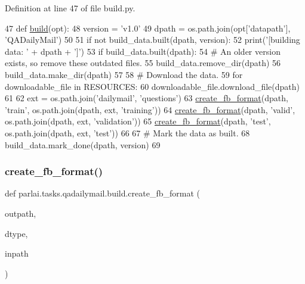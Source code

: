Definition at line 47 of file build.\+py.


\begin{DoxyCode}
47 \textcolor{keyword}{def }\hyperlink{namespacedialog__babi__feedback_1_1build_a7a9d289f7493a5ded13c4b7f071b6184}{build}(opt):
48     version = \textcolor{stringliteral}{'v1.0'}
49     dpath = os.path.join(opt[\textcolor{stringliteral}{'datapath'}], \textcolor{stringliteral}{'QADailyMail'})
50 
51     \textcolor{keywordflow}{if} \textcolor{keywordflow}{not} build\_data.built(dpath, version):
52         print(\textcolor{stringliteral}{'[building data: '} + dpath + \textcolor{stringliteral}{']'})
53         \textcolor{keywordflow}{if} build\_data.built(dpath):
54             \textcolor{comment}{# An older version exists, so remove these outdated files.}
55             build\_data.remove\_dir(dpath)
56         build\_data.make\_dir(dpath)
57 
58         \textcolor{comment}{# Download the data.}
59         \textcolor{keywordflow}{for} downloadable\_file \textcolor{keywordflow}{in} RESOURCES:
60             downloadable\_file.download\_file(dpath)
61 
62         ext = os.path.join(\textcolor{stringliteral}{'dailymail'}, \textcolor{stringliteral}{'questions'})
63         \hyperlink{namespaceparlai_1_1tasks_1_1wikiqa_1_1build_a554828702769592403db58c955d1dfe3}{create\_fb\_format}(dpath, \textcolor{stringliteral}{'train'}, os.path.join(dpath, ext, \textcolor{stringliteral}{'training'}))
64         \hyperlink{namespaceparlai_1_1tasks_1_1wikiqa_1_1build_a554828702769592403db58c955d1dfe3}{create\_fb\_format}(dpath, \textcolor{stringliteral}{'valid'}, os.path.join(dpath, ext, \textcolor{stringliteral}{'validation'}))
65         \hyperlink{namespaceparlai_1_1tasks_1_1wikiqa_1_1build_a554828702769592403db58c955d1dfe3}{create\_fb\_format}(dpath, \textcolor{stringliteral}{'test'}, os.path.join(dpath, ext, \textcolor{stringliteral}{'test'}))
66 
67         \textcolor{comment}{# Mark the data as built.}
68         build\_data.mark\_done(dpath, version)
69 \end{DoxyCode}
\mbox{\label{namespaceparlai_1_1tasks_1_1qadailymail_1_1build_a91296a105f8b2d3f5c53d34282cf6e62}} 
\subsubsection{\texorpdfstring{create\+\_\+fb\+\_\+format()}{create\_fb\_format()}}
{\footnotesize\ttfamily def parlai.\+tasks.\+qadailymail.\+build.\+create\+\_\+fb\+\_\+format (\begin{DoxyParamCaption}\item[{}]{outpath,  }\item[{}]{dtype,  }\item[{}]{inpath }\end{DoxyParamCaption})}



